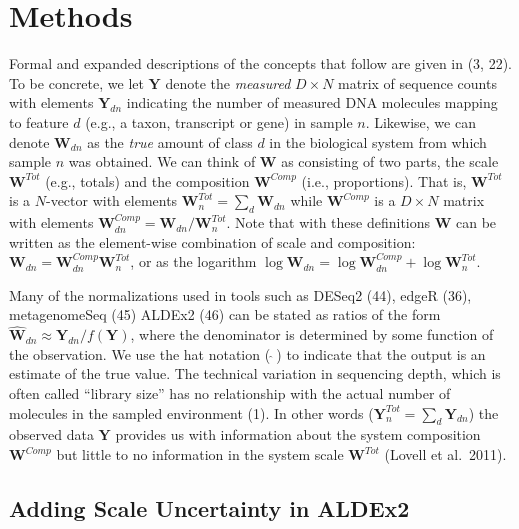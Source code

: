 \documentclass[
]{article}
\begin{document}
\section{Methods}\label{methods}

Formal and expanded descriptions of the concepts that follow are given
in (3, 22). To be concrete, we let \(\mathbf{Y}\) denote the
\emph{measured} \(D \times N\) matrix of sequence counts with elements
\(\mathbf{Y}_{dn}\) indicating the number of measured DNA molecules
mapping to feature \(d\) (e.g., a taxon, transcript or gene) in sample
\(n\). Likewise, we can denote \(\mathbf{W}_{dn}\) as the \emph{true}
amount of class \(d\) in the biological system from which sample \(n\)
was obtained. We can think of \(\mathbf{W}\) as consisting of two parts,
the scale \(\mathbf{W}^{Tot}\) (e.g., totals) and the composition
\(\mathbf{W}^{Comp}\) (i.e., proportions). That is, \(\mathbf{W}^{Tot}\)
is a \(N\)-vector with elements
\(\mathbf{W}^{Tot}_{n}=\sum_{d}\mathbf{W}_{dn}\) while
\(\mathbf{W}^{Comp}\) is a \(D \times N\) matrix with elements
\(\mathbf{W}^{Comp}_{dn}=\mathbf{W}_{dn}/\mathbf{W}^{Tot}_{n}\). Note
that with these definitions \(\mathbf{W}\) can be written as the
element-wise combination of scale and composition:
\(\mathbf{W}_{dn}=\mathbf{W}^{Comp}_{dn}\mathbf{W}^{Tot}_{n}\), or as
the logarithm
\(\log \mathbf{W}_{dn}= \log \mathbf{W}^{Comp}_{dn} + \log \mathbf{W}^{Tot}_{n}\).

Many of the normalizations used in tools such as DESeq2 (44), edgeR
(36), metagenomeSeq (45) ALDEx2 (46) can be stated as ratios of the form
\(\hat{{\mathbf{W}}}_{dn} \approx \mathbf{Y}_{dn}/f(\mathbf{Y})\), where
the denominator is determined by some function of the observation. We
use the hat notation (\(\ \hat{}\ \)) to indicate that the output is an
estimate of the true value. The technical variation in sequencing depth,
which is often called ``library size'' has no relationship with the
actual number of molecules in the sampled environment (1). In other
words (\(\mathbf{Y}^{Tot}_{n}=\sum_{d}\mathbf{Y}_{dn}\)) the observed
data \(\mathbf{Y}\) provides us with information about the system
composition \(\mathbf{W}^{Comp}\) but little to no information in the
system scale \(\mathbf{W}^{Tot}\) (Lovell et al.~2011).

\subsection{Adding Scale Uncertainty in
ALDEx2}\label{adding-scale-uncertainty-in-aldex2}
\end{document}
